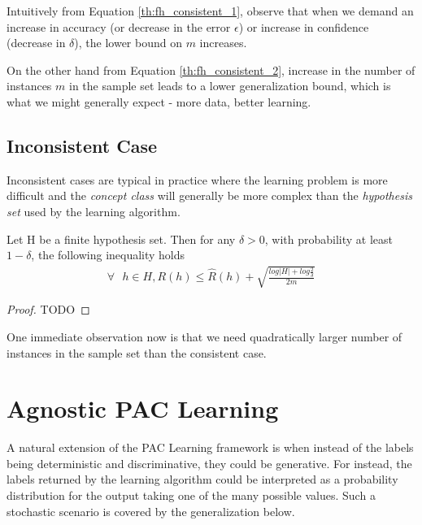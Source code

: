 \documentclass[../main]{subfiles}
\begin{document}
Intuitively from Equation \ref{th:fh_consistent_1}, observe that when we demand an
increase in accuracy (or decrease in the error $\epsilon$) or increase in confidence
(decrease in $\delta$), the lower bound on $m$ increases.

On the other hand from Equation \ref{th:fh_consistent_2}, increase in the number of
instances $m$ in the sample set leads to a lower generalization bound, which is what
we might generally expect - more data, better learning.

\subsection{Inconsistent Case}

Inconsistent cases are typical in practice where the learning problem is more
difficult and the \textit{concept class} will generally be more complex than the
\textit{hypothesis set} used by the learning algorithm.

\begin{theorem}
Let H be a finite hypothesis set. Then for any $\delta > 0$, with probability at least 
$1-\delta$, the following inequality holds
\begin{align}
\forall \text{ } h \in H, R(h) \leq \hat{R}(h) + \sqrt{\frac{log |H| + log \frac{2}{\delta}}{2m}}
\end{align}
\end{theorem}

\begin{proof}
TODO
\end{proof}

One immediate observation now is that we need quadratically larger number of instances
in the sample set than the consistent case.

\section{Agnostic PAC Learning}

A natural extension of the PAC Learning framework is when instead of the labels being
deterministic and discriminative, they could be generative. For instead, the labels
returned by the learning algorithm could be interpreted as a probability distribution
for the output taking one of the many possible values. Such a stochastic scenario is
covered by the generalization below.
\end{document}
